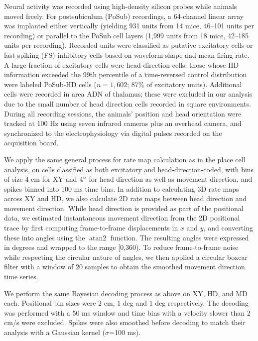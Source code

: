 \documentclass[11pt]{article}
\begin{document}
Neural activity was recorded using high-density silicon probes while animals moved freely. For postsubiculum (PoSub) recordings, a 64-channel linear array was implanted either vertically (yielding 931 units from 14 mice, 46–101 units per recording) or parallel to the PoSub cell layers (1,999 units from 18 mice, 42–185 units per recording). Recorded units were classified as putative excitatory cells or fast-spiking (FS) inhibitory cells based on waveform shape and mean firing rate. A large fraction of excitatory cells were head-direction cells: those whose HD information exceeded the 99th percentile of a time-reversed control distribution were labeled PoSub-HD cells ($n = 1,602$; $87\%$ of excitatory units). Additional cells were recorded in area ADN of thalamus; these were excluded in our analysis due to the small number of head direction cells recorded in square environments. During all recording sessions, the animals’ position and head orientation were tracked at 100 Hz using seven infrared cameras plus an overhead camera, and synchronized to the electrophysiology via digital pulses recorded on the acquisition board. 

We apply the same general process for rate map calculation as in the place cell analysis, on cells classified as both excitatory and head-direction-coded, with bins of size 4 cm for XY and $4\degree$ for head direction as well as movement direction, and spikes binned into 100 ms time bins. In addition to calculating 3D rate maps across XY and HD, we also calculate 2D rate maps between head direction and movement direction. While head direction is provided as part of the positional data, we estimated instantaneous movement direction from the 2D positional trace by first computing frame-to-frame displacements in $x$ and $y$, and converting these into angles using the $\operatorname{atan2}$ function. The resulting angles were expressed in degrees and wrapped to the range [0,360). To reduce frame-to-frame noise while respecting the circular nature of angles, we then applied a circular boxcar filter with a window of 20 samples to obtain the smoothed movement direction time series.

We perform the same Bayesian decoding process as above on XY, HD, and MD each. Positional bin sizes were 2 cm, 1 deg and 1 deg respectively. The decoding was performed with a 50 ms window and time bins with a velocity slower than 2 cm/s were excluded. Spikes were also smoothed before decoding to match their analysis with a Gaussian kernel ($\sigma$=100 ms). 
\end{document}
